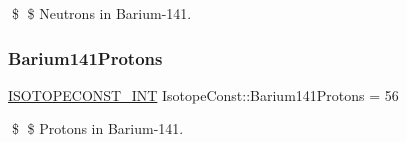\$ \$ Neutrons in Barium-\/141. \mbox{\label{group___isotope_const-_barium-_ba141_ga17a126564402b2f4e7f14dcecfb8e16d}} 
\subsubsection{\texorpdfstring{Barium141\+Protons}{Barium141Protons}}
{\footnotesize\ttfamily \mbox{\hyperlink{group___isotope_const-_macros_ga5f18360b3e99483a35c32d789e62621c}{I\+S\+O\+T\+O\+P\+E\+C\+O\+N\+S\+T\+\_\+\+I\+NT}} Isotope\+Const\+::\+Barium141\+Protons = 56}

\$ \$ Protons in Barium-\/141. 